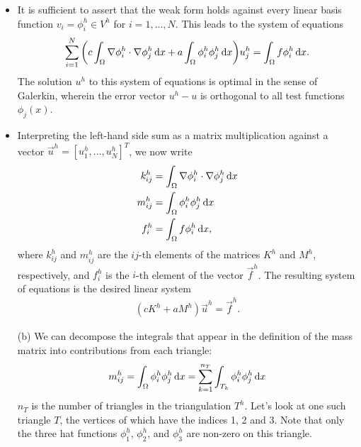 \begin{problem}{1}
\begin{solution}
\begin{itemize}
\item It is sufficient to assert that the weak form holds
against every linear basis function
$v_i=\phi_i^h \in V^h$ for $i = 1,...,N$.
This leads to the system of equations
\begin{align*}
    \sum_{i=1}^N \bigg(
    c \int_\Omega \nabla \phi_i^h \cdot \nabla \phi_j^h \operatorname{d}\!{x} + 
    a \int_\Omega \phi_i^h \phi_j^h \operatorname{d}\!{x} 
    \bigg) u_j^h = 
    \int_\Omega f \phi_i^h \operatorname{d}\!{x}.
\end{align*}
The solution $u^h$ to this system of equations is optimal in the sense
of Galerkin, wherein the error vector $u^h-u$ is orthogonal to all
test functions $\phi_j(x)$.

\item Interpreting the left-hand side sum as a matrix multiplication
against a vector $\vec{u}^h = [u_1^h,...,u_N^h]^T$,
we now write
\begin{align*}
    k_{ij}^h &= \int_{\Omega} \nabla\phi_i^h \cdot
    \nabla\phi_j^h \operatorname{d}\!{x} \\
    m_{ij}^h &= \int_{\Omega} \phi_i^h \phi_j^h \operatorname{d}\!{x} \\
    f_i^h &= \int_{\Omega} f \phi_i^h \operatorname{d}\!{x},
\end{align*}
where $k_{ij}^h$ and $m_{ij}^h$ are the $ij$-th elements of the matrices
$K^h$ and $M^h$, respectively, and $f_i^h$ is the $i$-th element
of the vector $\vec{f}^h$. The resulting system of equations
is the desired linear system
\begin{align}
    (cK^h + aM^h)\vec{u}^h = \vec{f}^h.
\end{align}

\end{itemize}

\end{solution}
\pagebreak

\begin{itemize}
	\item[(b)] We can decompose the integrals that appear in the
	definition of the mass matrix into contributions from each
	triangle:
	\begin{align*}
	m_{ij}^h = \int_\Omega \phi_i^h \phi_j^h \operatorname{d}\!{x} = 
	\sum_{k=1}^{n_T} \int_{T_k} \phi_i^h \phi_j^h \operatorname{d}\!{x}
    \end{align*}
    $n_T$ is the number of triangles in the triangulation $T^h$.
    Let's look at one such triangle $T$, the vertices of which have the
    indices 1, 2 and 3. Note that only the three hat functions
    $\phi_1^h$, $\phi_2^h$, and $\phi_3^h$
    are non-zero on this triangle.
    

\end{itemize}
\end{problem}
